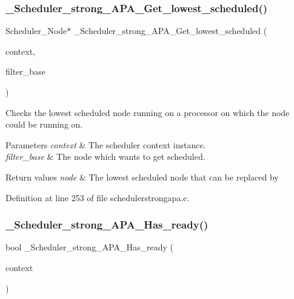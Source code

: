 \subsubsection{\texorpdfstring{\+\_\+\+Scheduler\+\_\+strong\+\_\+\+A\+P\+A\+\_\+\+Get\+\_\+lowest\+\_\+scheduled()}{\_Scheduler\_strong\_APA\_Get\_lowest\_scheduled()}}
{\footnotesize\ttfamily Scheduler\+\_\+\+Node$\ast$ \+\_\+\+Scheduler\+\_\+strong\+\_\+\+A\+P\+A\+\_\+\+Get\+\_\+lowest\+\_\+scheduled (\begin{DoxyParamCaption}\item[{Scheduler\+\_\+\+Context $\ast$}]{context,  }\item[{Scheduler\+\_\+\+Node $\ast$}]{filter\+\_\+base }\end{DoxyParamCaption})}



Checks the lowest scheduled node running on a processor on which the  node could be running on. 


\begin{DoxyParams}{Parameters}
{\em context} & The scheduler context instance. \\
\hline
{\em filter\+\_\+base} & The node which wants to get scheduled.\\
\hline
\end{DoxyParams}

\begin{DoxyRetVals}{Return values}
{\em node} & The lowest scheduled node that can be replaced by  \\
\hline
\end{DoxyRetVals}


Definition at line 253 of file schedulerstrongapa.\+c.

\mbox{\label{group__RTEMSScoreSchedulerStrongAPA_ga1eb39ec8e5e7663e5696db912ddf01ba}} 
\subsubsection{\texorpdfstring{\+\_\+\+Scheduler\+\_\+strong\+\_\+\+A\+P\+A\+\_\+\+Has\+\_\+ready()}{\_Scheduler\_strong\_APA\_Has\_ready()}}
{\footnotesize\ttfamily bool \+\_\+\+Scheduler\+\_\+strong\+\_\+\+A\+P\+A\+\_\+\+Has\+\_\+ready (\begin{DoxyParamCaption}\item[{Scheduler\+\_\+\+Context $\ast$}]{context }\end{DoxyParamCaption})}



